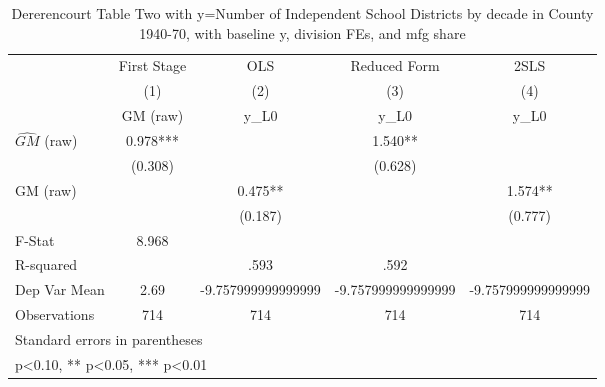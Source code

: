 \begin{table}[htbp]\centering
\def\sym#1{\ifmmode^{#1}\else\(^{#1}\)\fi}
\caption{Dererencourt Table Two with y=Number of Independent School Districts by decade in County 1940-70, with baseline y, division FEs, and mfg share}
\begin{tabular}{l*{4}{c}}
\toprule
                    & First Stage   &         OLS   &Reduced Form   &        2SLS   \\
                    &\multicolumn{1}{c}{(1)}&\multicolumn{1}{c}{(2)}&\multicolumn{1}{c}{(3)}&\multicolumn{1}{c}{(4)}\\
                    &\multicolumn{1}{c}{GM  (raw)}&\multicolumn{1}{c}{y\_L0}&\multicolumn{1}{c}{y\_L0}&\multicolumn{1}{c}{y\_L0}\\
\midrule
$\hat{GM}$ (raw)    &       0.978***&               &       1.540** &               \\
                    &     (0.308)   &               &     (0.628)   &               \\
\addlinespace
GM  (raw)           &               &       0.475** &               &       1.574** \\
                    &               &     (0.187)   &               &     (0.777)   \\
\midrule
F-Stat              &       8.968   &               &               &               \\
R-squared           &               &        .593   &        .592   &               \\
Dep Var Mean        &        2.69   &-9.757999999999999   &-9.757999999999999   &-9.757999999999999   \\
Observations        &         714   &         714   &         714   &         714   \\
\bottomrule
\multicolumn{5}{l}{\footnotesize Standard errors in parentheses}\\
\multicolumn{5}{l}{\footnotesize * p<0.10, ** p<0.05, *** p<0.01}\\
\end{tabular}
\end{table}
